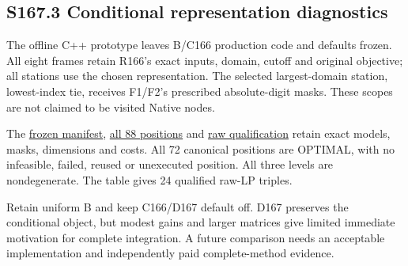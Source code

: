 \documentclass[
  american,
  11pt,
]{article}
\begin{document}
\begin{landscape}

\subsection{S167.3 Conditional representation
diagnostics}\label{s167.3-conditional-representation-diagnostics}

The offline C++ prototype leaves B/C166 production code and defaults
frozen. All eight frames retain R166's exact inputs, domain, cutoff and
original objective; all stations use the chosen representation. The
selected largest-domain station, lowest-index tie, receives F1/F2's
prescribed absolute-digit masks. These scopes are not claimed to be
visited Native nodes.

The
\href{https://github.com/yifanXovo/TailoredExact/blob/codex/round172-journal-manuscript/results/unified_exact_round167/diagnostic_manifest.json}{frozen
manifest},
\href{https://github.com/yifanXovo/TailoredExact/blob/codex/round172-journal-manuscript/results/unified_exact_round167/positions.csv}{all
88 positions} and
\href{https://github.com/yifanXovo/TailoredExact/blob/codex/round172-journal-manuscript/results/unified_exact_round167/qualification.json}{raw
qualification} retain exact models, masks, dimensions and costs. All 72
canonical positions are OPTIMAL, with no infeasible, failed, reused or
unexecuted position. All three levels are nondegenerate. The table gives
24 qualified raw-LP triples.

Retain uniform B and keep C166/D167 default off. D167 preserves the
conditional object, but modest gains and larger matrices give limited
immediate motivation for complete integration. A future comparison needs
an acceptable implementation and independently paid complete-method
evidence.


\end{landscape}
\end{document}
